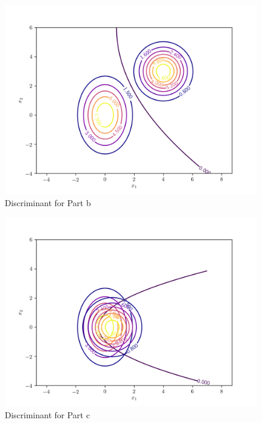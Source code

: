 \documentclass{article}[12pt]
\begin{document}
\begin{figure}[ht]
	\centerline{
		\includegraphics[scale=0.7]{../scripts/p1/discriminant_b.png}}
	\caption{Discriminant for Part b}
	\label{fig:dpb}
\end{figure}


\begin{figure}[ht]
	\centerline{
		\includegraphics[scale=0.7]{../scripts/p1/discriminant_c.png}}
	\caption{Discriminant for Part c}
	\label{fig:dpc}
\end{figure}
\end{document}
